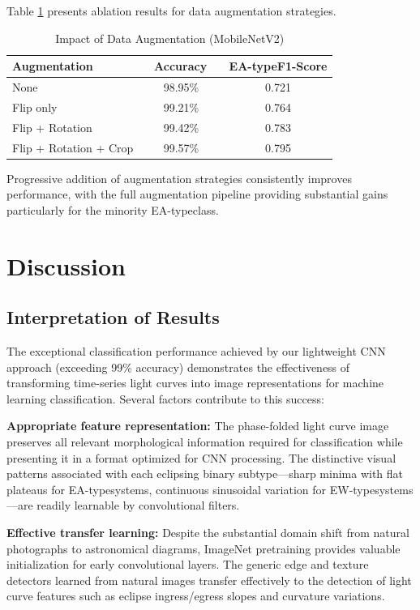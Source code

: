 \documentclass[11pt,a4paper]{article}
\newcommand{\EA}{EA-type}
\newcommand{\EW}{EW-type}
\begin{document}
Table \ref{tab:ablation_augment} presents ablation results for data augmentation strategies.

\begin{table}[htbp]
\centering
\caption{Impact of Data Augmentation (MobileNetV2)}
\label{tab:ablation_augment}
\begin{tabular}{lcc}
\toprule
\textbf{Augmentation} \ &  \textbf{Accuracy} \ &  \textbf{\EA F1-Score} \\
\midrule
None \ &  98.95\% \ &  0.721 \\
Flip only \ &  99.21\% \ &  0.764 \\
Flip + Rotation \ &  99.42\% \ &  0.783 \\
Flip + Rotation + Crop \ &  99.57\% \ &  0.795 \\
\bottomrule
\end{tabular}
\end{table}

Progressive addition of augmentation strategies consistently improves performance, with the full augmentation pipeline providing substantial gains particularly for the minority \EA class.

\section{Discussion}\label{sec:discussion}

\subsection{Interpretation of Results}

The exceptional classification performance achieved by our lightweight CNN approach (exceeding 99\% accuracy) demonstrates the effectiveness of transforming time-series light curves into image representations for machine learning classification. Several factors contribute to this success:

\textbf{Appropriate feature representation:} The phase-folded light curve image preserves all relevant morphological information required for classification while presenting it in a format optimized for CNN processing. The distinctive visual patterns associated with each eclipsing binary subtype---sharp minima with flat plateaus for \EA systems, continuous sinusoidal variation for \EW systems---are readily learnable by convolutional filters.

\textbf{Effective transfer learning:} Despite the substantial domain shift from natural photographs to astronomical diagrams, ImageNet pretraining provides valuable initialization for early convolutional layers. The generic edge and texture detectors learned from natural images transfer effectively to the detection of light curve features such as eclipse ingress/egress slopes and curvature variations.
\end{document}
